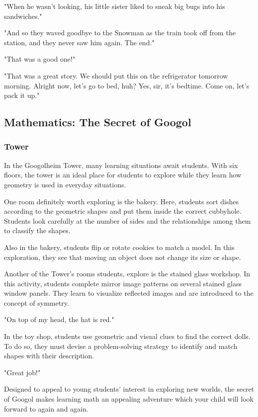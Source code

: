 "When he wasn't looking, his little sister liked to sneak big bugs into his sandwiches."

"And so they waved goodbye to the Snowman as the train took off from the station, and they never saw him again.
The end."

"That was a good one!"

"That was a great story.
We should put this on the refrigerator tomorrow morning.
Alright now, let's go to bed, huh?
Yes, sir, it's bedtime. Come on, let's pack it up."

\subsection{Mathematics: The Secret of Googol}

\subsubsection{Tower}

In the Googolheim Tower, many learning situations await students.
With six floors, the tower is an ideal place for students to explore while they learn how geometry is used in everyday situations.

One room definitely worth exploring is the bakery.
Here, students sort dishes according to the geometric shapes and put them inside the correct cubbyhole.
Students look carefully at the number of sides and the relationships among them to classify the shapes.

Also in the bakery, students flip or rotate cookies to match a model.
In this exploration, they see that moving an object does not change its size or shape.

Another of the Tower's rooms students, explore is the stained glass workshop.
In this activity, students complete mirror image patterns on several stained glass window panels.
They learn to visualize reflected images and are introduced to the concept of symmetry.

"On top of my head, the hat is red."

In the toy shop, students use geometric and visual clues to find the correct dolls.
To do so, they must devise a problem-solving strategy to identify and match shapes with their description.

"Great job!"

Designed to appeal to young students' interest in exploring new worlds, the secret of Googol makes learning math an appealing adventure which your child will look forward to again and again.

